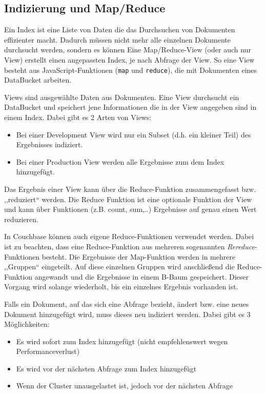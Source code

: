 \subsection{Indizierung und Map/Reduce}
Ein Index ist eine Liste von Daten die das Durchsuchen von Dokumenten effizienter macht. Dadurch müssen nicht mehr alle einzelnen Dokumente durchsucht werden, sondern es können 	
Eine Map/Reduce-View (oder auch nur View) erstellt einen angepassten Index, je nach Abfrage der View. So eine View besteht aus JavaScript-Funktionen (\texttt{map} und \texttt{reduce}), die mit Dokumenten eines DataBucket arbeiten.

Views sind ausgewählte Daten aus Dokumenten. Eine View durchsucht ein DataBucket und speichert jene Informationen die in der View angegeben sind in einem Index. Dabei gibt es 2 Arten von Views:
\begin{itemize}
	\item Bei einer Development View wird nur ein Subset (d.h. ein kleiner Teil) des Ergebnisses indiziert. 
	\item Bei einer Production View werden alle Ergebnisse zum dem Index hinzugefügt.
\end{itemize}

Das Ergebnis einer View kann über die Reduce-Funktion zusammengefasst bzw. ,,reduziert`` werden. Die Reduce Funktion ist eine optionale Funktion der View und kann über Funktionen (z.B. count, sum,..) Ergebnisse auf genau einen Wert reduzieren. 

In Couchbase können auch eigene Reduce-Funktionen verwendet werden. Dabei ist zu beachten, dass eine Reduce-Funktion aus mehreren sogenannten \textit{Rereduce}-Funktionen besteht. Die Ergebnisse der Map-Funktion werden in mehrere ,,Gruppen`` eingeteilt. Auf diese einzelnen Gruppen wird anschließend die Reduce-Funktion angewandt und die Ergebnisse in einem B-Baum gespeichert. Dieser Vorgang wird solange wiederholt, bis ein einzelnes Ergebnis vorhanden ist.

Falls ein Dokument, auf das sich eine Abfrage bezieht, ändert bzw. eine neues Dokument hinzugefügt wird, muss dieses neu indiziert werden. Dabei gibt es 3 Möglichkeiten:
\begin{itemize}
	\item Es wird sofort zum Index hinzugefügt (nicht empfehlenswert wegen Performanceverlust)
	\item Es wird vor der nächsten Abfrage zum Index hinzugefügt
	\item Wenn der Cluster unausgelastet ist, jedoch vor der nächsten Abfrage
\end{itemize}

